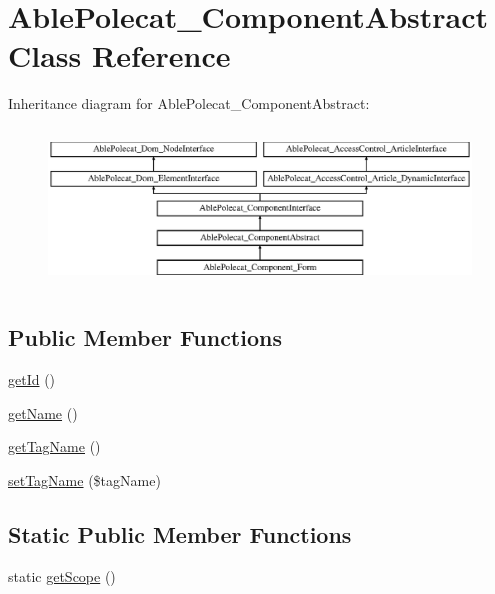 \hypertarget{class_able_polecat___component_abstract}{}\section{Able\+Polecat\+\_\+\+Component\+Abstract Class Reference}
\label{class_able_polecat___component_abstract}
Inheritance diagram for Able\+Polecat\+\_\+\+Component\+Abstract\+:\begin{figure}[H]
\begin{center}
\leavevmode
\includegraphics[height=4.268293cm]{class_able_polecat___component_abstract}
\end{center}
\end{figure}
\subsection*{Public Member Functions}
\begin{DoxyCompactItemize}
\item 
\hyperlink{class_able_polecat___component_abstract_a12251d0c022e9e21c137a105ff683f13}{get\+Id} ()
\item 
\hyperlink{class_able_polecat___component_abstract_a3d0963e68bb313b163a73f2803c64600}{get\+Name} ()
\item 
\hyperlink{class_able_polecat___component_abstract_a2a21085426efb4a6c3d9ed4db9f8524c}{get\+Tag\+Name} ()
\item 
\hyperlink{class_able_polecat___component_abstract_aea1e8292a0b88fba2af05b26e503a14c}{set\+Tag\+Name} (\$tag\+Name)
\end{DoxyCompactItemize}
\subsection*{Static Public Member Functions}
\begin{DoxyCompactItemize}
\item 
static \hyperlink{class_able_polecat___component_abstract_ad9ade868bd136d32967059d1cccb3e92}{get\+Scope} ()
\end{DoxyCompactItemize}
